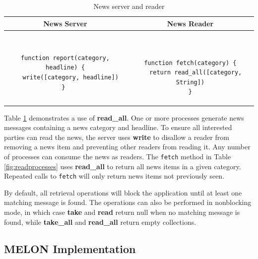 \documentclass{llncs}
\begin{document}
\begin{table}
\centering
\caption{News server and reader}
\begin{tabular}{|c|c|} \hline
\textbf{News Server} & \textbf{News Reader} \\ \hline
\begin{minipage}{2.45in}
\begin{verbatim}

function report(category, headline) {
   write([category, headline])
} 
\end{verbatim}
\end{minipage}
&
\begin{minipage}{2.5in}
\begin{verbatim}


function fetch(category) {
   return read_all([category, String])
}
\end{verbatim}
\end{minipage}
\\ \hline
\end{tabular}
\label{fig:newsreader}
\end{table}

Table \ref{fig:newsreader} demonstrates a use of \textbf{read\_all}. One or more processes generate news messages containing a news category and headline. To ensure all interested parties can read the news, the server uses \textbf{write} to disallow a reader from removing a news item and preventing other readers from reading it. Any number of processes can consume the news as readers. The \texttt{fetch} method in Table \ref{fig:readprocesses} uses \textbf{read\_all} to return all news items in a given category. Repeated calls to \texttt{fetch} will only return news items not previously seen.

By default, all retrieval operations will block the application until at least one matching message is found. The operations can also be performed in nonblocking mode, in which case \textbf{take} and \textbf{read} return null when no matching message is found, while \textbf{take\_all} and \textbf{read\_all} return empty collections.
   
\subsection{MELON Implementation}\label{sec:implementation}
\end{document}
